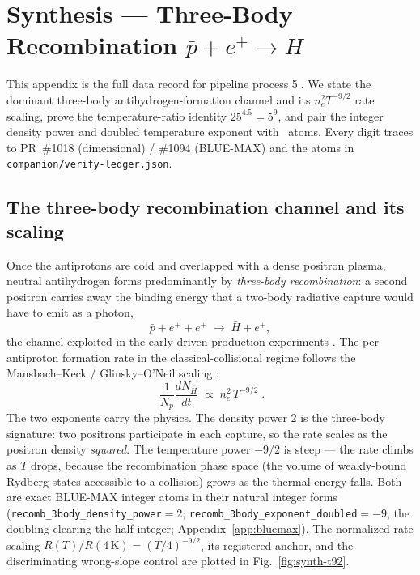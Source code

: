 \section{Synthesis --- Three-Body Recombination $\bar p + e^+ \to \bar H$}
\label{app:synthesis}

This appendix is the full data record for pipeline process
\textcircled{\scriptsize 5}. We state the dominant three-body
antihydrogen-formation channel and its $n_e^2 T^{-9/2}$ rate scaling, prove
the temperature-ratio identity $25^{4.5}=5^9$, and pair the integer density
power and doubled temperature exponent with \tierBlue\ atoms. Every digit
traces to PR~\#1018 (dimensional) / \#1094 (BLUE-MAX) and the atoms in
\texttt{companion/verify-ledger.json}.

\subsection{The three-body recombination channel and its scaling}
\label{app:synth-deriv}

Once the antiprotons are cold and overlapped with a dense positron plasma,
neutral antihydrogen forms predominantly by \emph{three-body recombination}:
a second positron carries away the binding energy that a two-body radiative
capture would have to emit as a photon,
\begin{equation}
\bar p + e^+ + e^+ \;\longrightarrow\; \bar H + e^+ ,
\label{eq:synth-channel}
\end{equation}
the channel exploited in the early driven-production experiments
\citep{gabrielse2002driven}. The per-antiproton formation rate in the
classical-collisional regime follows the Mansbach--Keck / Glinsky--O'Neil
scaling \citep{glinsky1991oneil}:
\begin{equation}
\boxed{\;\frac{1}{N_{\bar p}}\frac{dN_{\bar H}}{dt}
\;\propto\; n_e^{2}\,T^{-9/2}\;}.
\label{eq:synth-scaling}
\end{equation}
The two exponents carry the physics. The density power $2$ is the
three-body signature: two positrons participate in each capture, so the rate
scales as the positron density \emph{squared}. The temperature power
$-9/2$ is steep --- the rate climbs as $T$ drops, because the recombination
phase space (the volume of weakly-bound Rydberg states accessible to a
collision) grows as the thermal energy falls. Both are exact BLUE-MAX integer
atoms in their natural integer forms (\verb|recomb_3body_density_power|$=2$;
\verb|recomb_3body_exponent_doubled|$=-9$, the doubling clearing the
half-integer; Appendix~\ref{app:bluemax}). The normalized rate scaling
$R(T)/R(4\,\mathrm{K})=(T/4)^{-9/2}$, its registered anchor, and the
discriminating wrong-slope control are plotted in Fig.~\ref{fig:synth-t92}.

